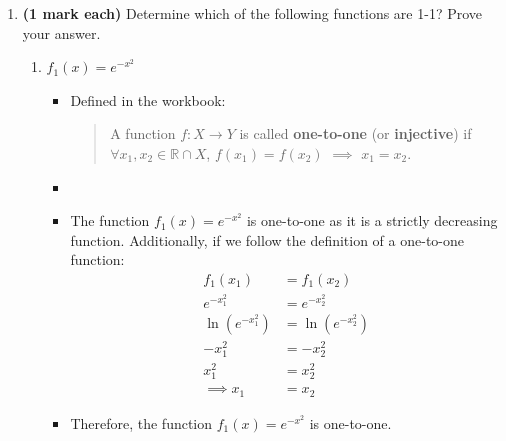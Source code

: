 \documentclass[12pt]{report}
\begin{document}
\begin{enumerate}[leftmargin=\labelsep]
    \item {\bf (1 mark each)} Determine which of the following functions are 1-1? Prove your answer.
        \begin{enumerate}
            \item $f_1(x)=e^{-x^2}$
                \begin{tcolorbox}
                    \begin{itemize}[label={}]
                        \item Defined in the workbook:
                        \begin{quote}
                            A function $f: X\to Y$ is called {\bf one-to-one} (or {\bf injective}) if $\forall x_1,x_2 \in \mathbb{R} \cap X$, $f(x_1)=f(x_2)$ $\implies$ $x_1=x_2$.
                        \end{quote}
                        \item
                        \item The function $f_1(x)=e^{-x^2}$ is one-to-one as it is a strictly decreasing function. Additionally, if we follow the definition of a one-to-one function:
                        \begin{equation*}
                            \begin{split}
                                f_1(x_1) &= f_1(x_2) \\
                                e^{-x_1^2} &= e^{-x_2^2} \\
                                \ln (e^{-x_1^2}) &= \ln (e^{-x_2^2}) \\
                                -x_1^2 &= -x_2^2 \\
                                x_1^2 &= x_2^2 \\
                                \implies x_1 &= x_2
                            \end{split}
                        \end{equation*}
                        \item Therefore, the function $f_1(x)=e^{-x^2}$ is one-to-one.
                        
                    \end{itemize}
                \end{tcolorbox}
                

\end{enumerate}
\end{enumerate}
\end{document}
